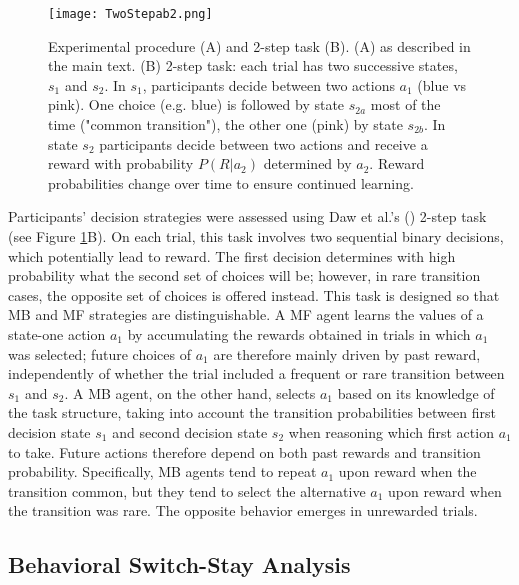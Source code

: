 \documentclass[11pt]{article} %
\begin{document}
\begin{figure}
	\texttt{[image: TwoStepab2.png]}
	\caption{Experimental procedure (A) and 2-step task (B). (A) as described in the main text. (B) 2-step task: each trial has two successive states, $s_{1}$ and $s_{2}$. In $s_{1}$, participants decide between two actions $a_{1}$ (blue vs pink). One choice (e.g. blue) is followed by state $s_{2a}$ most of the time ("common transition"), the other one (pink) by state $s_{2b}$. In state $s_{2}$ participants decide between two actions and receive a reward with probability $P(R|a_{2})$ determined by $a_{2}$. Reward probabilities change over time to ensure continued learning.}
	\label{TwoStep}
\end{figure}

Participants' decision strategies were assessed using Daw et al.'s (\cite{daw_model-based_2011}) 2-step task (see Figure \ref{TwoStep}B). On each trial, this task involves two sequential binary decisions, which potentially lead to reward. The first decision determines with high probability what the second set of choices will be; however, in rare transition cases, the opposite set of choices is offered instead. This task is designed so that MB and MF strategies are distinguishable. A MF agent learns the values of a state-one action $a_{1}$ by accumulating the rewards obtained in trials in which $a_{1}$ was selected; future choices of $a_{1}$ are therefore mainly driven by past reward, independently of whether the trial included a frequent or rare transition between $s_{1}$ and $s_{2}$. A MB agent, on the other hand, selects $a_{1}$ based on its knowledge of the task structure, taking into account the transition probabilities between first decision state $s_{1}$ and second decision state $s_{2}$ when reasoning which first action $a_{1}$ to take. Future actions therefore depend on both past rewards and transition probability. Specifically, MB agents tend to repeat $a_{1}$ upon reward when the transition common, but they tend to select the alternative $a_{1}$ upon reward when the transition was rare. The opposite behavior emerges in unrewarded trials.

\subsection{Behavioral Switch-Stay Analysis}
\end{document}
